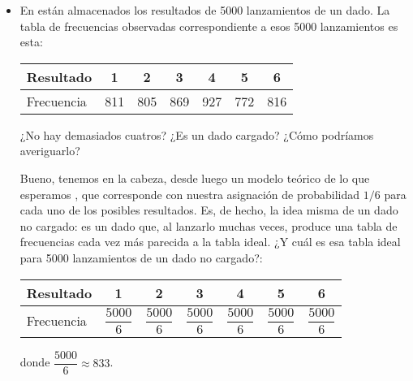 \begin{itemize}
    \item En  están almacenados los resultados de 5000 lanzamientos de un dado. La tabla de frecuencias observadas correspondiente a esos 5000 lanzamientos es esta:
    \begin{center}
    \begin{tabular}{|l|c|c|c|c|c|c|}
      \hline
      Resultado & 1 & 2 & 3 & 4 & 5 & 6 \\
      \hline
      Frecuencia & 811 & 805 & 869 & 927 & 772 & 816\\
      \hline
    \end{tabular}
    \end{center}
    ¿No hay demasiados cuatros? ¿Es un dado cargado? ¿Cómo podríamos averiguarlo?

    Bueno, tenemos en la cabeza, desde luego un modelo {\sf teórico} de lo que esperamos , que corresponde con nuestra asignación de probabilidad $1/6$ para cada uno de los posibles resultados. Es, de hecho, la idea misma de un dado no cargado: es un dado que, al lanzarlo muchas veces, produce una tabla de frecuencias cada vez más parecida a la tabla ideal. ¿Y cuál es esa tabla ideal para 5000 lanzamientos de un dado no cargado?:
    \begin{center}
    \begin{tabular}{|l|c|c|c|c|c|c|}
      \hline
      Resultado & 1 & 2 & 3 & 4 & 5 & 6 \\
      \hline
      Frecuencia \rule{0cm}{0.6cm}& $\dfrac{5000}{6}$ & $\dfrac{5000}{6}$ & $\dfrac{5000}{6}$ & $\dfrac{5000}{6}$ & $\dfrac{5000}{6}$ & $\dfrac{5000}{6}$\\[2mm]
      \hline
    \end{tabular}
    \end{center}
    donde $\dfrac{5000}{6}\approx 833$.


\end{itemize}
